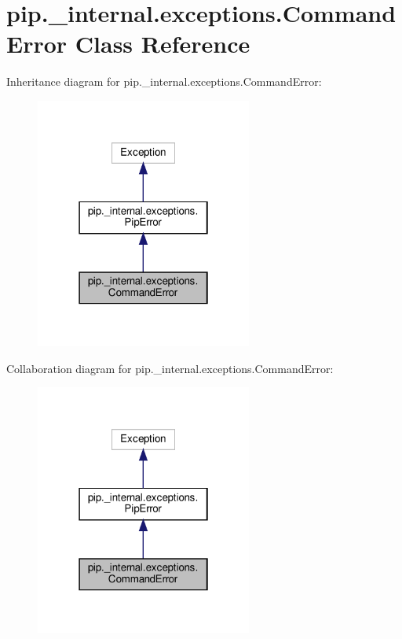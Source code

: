 \hypertarget{classpip_1_1__internal_1_1exceptions_1_1CommandError}{}\section{pip.\+\_\+internal.\+exceptions.\+Command\+Error Class Reference}
\label{classpip_1_1__internal_1_1exceptions_1_1CommandError}


Inheritance diagram for pip.\+\_\+internal.\+exceptions.\+Command\+Error\+:
\nopagebreak
\begin{figure}[H]
\begin{center}
\leavevmode
\includegraphics[width=202pt]{classpip_1_1__internal_1_1exceptions_1_1CommandError__inherit__graph}
\end{center}
\end{figure}


Collaboration diagram for pip.\+\_\+internal.\+exceptions.\+Command\+Error\+:
\nopagebreak
\begin{figure}[H]
\begin{center}
\leavevmode
\includegraphics[width=202pt]{classpip_1_1__internal_1_1exceptions_1_1CommandError__coll__graph}
\end{center}
\end{figure}


